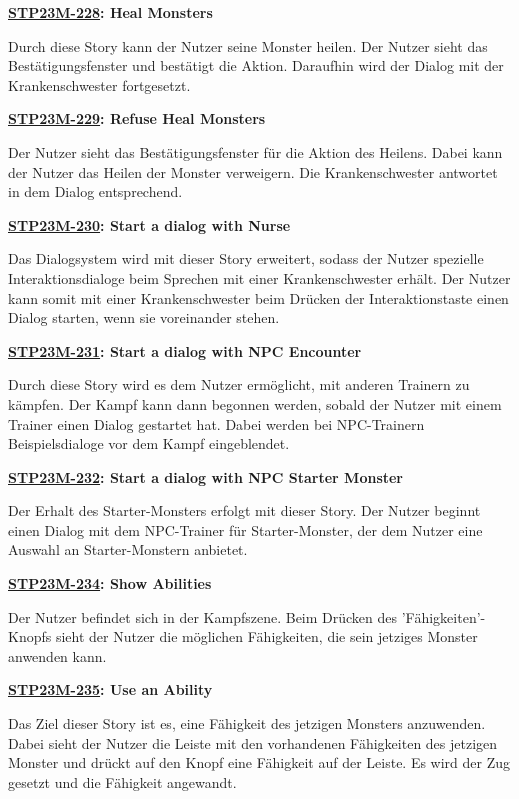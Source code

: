 \textbf{\hyperlink{T228}{\hypertarget{S228}{STP23M-228}}: Heal Monsters}

Durch diese Story kann der Nutzer seine Monster heilen. Der Nutzer sieht das Bestätigungsfenster und bestätigt die Aktion. Daraufhin wird der Dialog mit der Krankenschwester fortgesetzt.

\textbf{\hyperlink{T229}{\hypertarget{S229}{STP23M-229}}: Refuse Heal Monsters}

Der Nutzer sieht das Bestätigungsfenster für die Aktion des Heilens. Dabei kann der Nutzer das Heilen der Monster verweigern. Die Krankenschwester antwortet in dem Dialog entsprechend. 

\textbf{\hyperlink{T230}{\hypertarget{S230}{STP23M-230}}: Start a dialog with Nurse}

Das Dialogsystem wird mit dieser Story erweitert, sodass der Nutzer spezielle Interaktionsdialoge beim Sprechen mit einer Krankenschwester erhält. Der Nutzer kann somit mit einer Krankenschwester beim Drücken der Interaktionstaste einen Dialog starten, wenn sie voreinander stehen.

\textbf{\hyperlink{T231}{\hypertarget{S231}{STP23M-231}}: Start a dialog with NPC Encounter}

Durch diese Story wird es dem Nutzer ermöglicht, mit anderen Trainern zu kämpfen. Der Kampf kann dann begonnen werden, sobald der Nutzer mit einem Trainer einen Dialog gestartet hat. Dabei werden bei NPC-Trainern Beispielsdialoge vor dem Kampf eingeblendet.

\textbf{\hyperlink{T232}{\hypertarget{S232}{STP23M-232}}: Start a dialog with NPC Starter Monster}

Der Erhalt des Starter-Monsters erfolgt mit dieser Story. Der Nutzer beginnt einen Dialog mit dem NPC-Trainer für Starter-Monster, der dem Nutzer eine Auswahl an Starter-Monstern anbietet.

\textbf{\hyperlink{T234}{\hypertarget{S234}{STP23M-234}}: Show Abilities}

Der Nutzer befindet sich in der Kampfszene. Beim Drücken des 'Fähigkeiten'-Knopfs sieht der Nutzer die möglichen Fähigkeiten, die sein jetziges Monster anwenden kann.

\textbf{\hyperlink{T235}{\hypertarget{S235}{STP23M-235}}: Use an Ability}

Das Ziel dieser Story ist es, eine Fähigkeit des jetzigen Monsters anzuwenden. Dabei sieht der Nutzer die Leiste mit den vorhandenen Fähigkeiten des jetzigen Monster und drückt auf den Knopf eine Fähigkeit auf der Leiste. Es wird der Zug gesetzt und die Fähigkeit angewandt.

